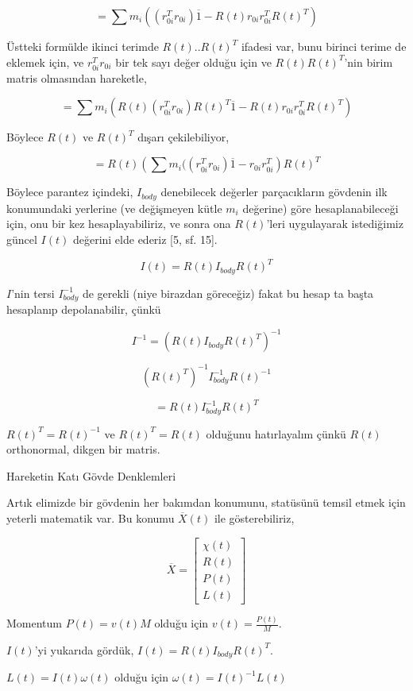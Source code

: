 \documentclass[12pt,fleqn]{article}\usepackage{../../common}
\begin{document}
$$
= \sum
m_i ( (r_{0i}^T r_{0i}) \overline{1} -  R(t) r_{0i} r_{0i}^T R(t)^T )
$$


Üstteki formülde ikinci terimde $R(t) .. R(t)^T$ ifadesi var, bunu
birinci terime de eklemek için, ve $r_{0i}^T r_{0i}$ bir tek sayı değer
olduğu için ve $R(t) R(t)^T$'nin birim matris olmasından hareketle,

$$
= \sum
m_i ( R(t) (r_{0i}^T r_{0i}) R(t)^T \overline{1} -  R(t) r_{0i} r_{0i}^T R(t)^T )
$$

Böylece $R(t)$ ve $R(t)^T$ dışarı çekilebiliyor,

$$
= R(t) \left( \sum 
m_i (( r_{0i}^T r_{0i}) \overline{1} -  r_{0i} r_{0i}^T
\right)  R(t)^T 
$$

Böylece parantez içindeki, $I_{body}$ denebilecek değerler parçacıkların
gövdenin ilk konumundaki yerlerine (ve değişmeyen kütle $m_i$ değerine) göre
hesaplanabileceği için, onu bir kez hesaplayabiliriz, ve sonra ona $R(t)$'leri
uygulayarak istediğimiz güncel $I(t)$ değerini elde ederiz [5, sf. 15].

$$
I(t) = R(t) I_{body} R(t)^T
$$

$I$'nin tersi $I_{body}^{-1}$ de gerekli (niye birazdan göreceğiz) fakat bu
hesap ta başta hesaplanıp depolanabilir, çünkü

$$
I^{-1} = ( R(t) I_{body} R(t)^T )^{-1} 
$$

$$
(R(t)^T)^{-1} I_{body}^{-1} R(t)^{-1} 
$$

$$
= R(t) I_{body}^{-1} R(t)^T
$$

$R(t)^T = R(t)^{-1}$ ve $R(t)^T = R(t)$ olduğunu hatırlayalım çünkü $R(t)$
orthonormal, dikgen bir matris. 

Hareketin Katı Gövde Denklemleri

Artık elimizde bir gövdenin her bakımdan konumunu, statüsünü temsil etmek için yeterli
matematik var. Bu konumu $\overline{X}(t)$ ile gösterebiliriz,

$$
\overline{X} = \left[\begin{array}{c}
\chi(t) \\ R(t) \\ P(t) \\ L(t)
\end{array}\right]
$$

Momentum $P(t) = v(t) M$ olduğu için $v(t) = \frac{P(t)}{M}$.

$I(t)$'yi yukarıda gördük, $I(t) = R(t) I_{body} R(t)^T$.

$L(t) = I(t) \omega(t)$ olduğu için $\omega(t) = I(t)^{-1} L(t)$
\end{document}
